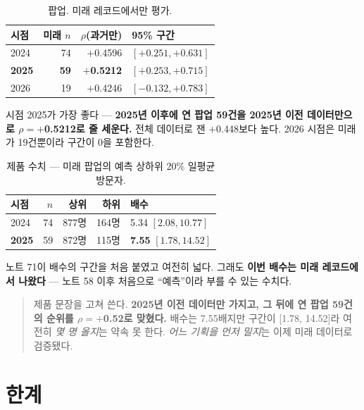 \documentclass[10pt]{article}
\begin{document}
\begin{table}[t]
\centering\tsize
\caption{팝업. 미래 레코드에서만 평가.}
\begin{tabular}{lrrl}
\toprule
시점 & 미래 $n$ & $\rho$(과거만) & 95\% 구간 \\
\midrule
2024 & 74 & $+$0.4596 & $[+0.251, +0.631]$ \\
\textbf{2025} & \textbf{59} & \textbf{$+$0.5212} & $[+0.253, +0.715]$ \\
2026 & 19 & $+$0.4246 & $[-0.132, +0.783]$ \\
\bottomrule
\end{tabular}
\end{table}

시점 2025가 가장 좋다 --- \textbf{2025년 이후에 연 팝업 59건을 2025년 이전
데이터만으로 $\rho=+$0.5212로 줄 세운다.} 전체 데이터로 잰 $+$0.448보다 높다.
2026 시점은 미래가 19건뿐이라 구간이 0을 포함한다.

\begin{table}[t]
\centering\tsize
\caption{제품 수치 --- 미래 팝업의 예측 상하위 20\% 일평균 방문자.}
\begin{tabular}{lrrrl}
\toprule
시점 & $n$ & 상위 & 하위 & 배수 \\
\midrule
2024 & 74 & 877명 & 164명 & 5.34 $[2.08, 10.77]$ \\
\textbf{2025} & 59 & 872명 & 115명 & \textbf{7.55} $[1.78, 14.52]$ \\
\bottomrule
\end{tabular}
\end{table}

노트 71이 배수의 구간을 처음 붙였고 여전히 넓다. 그래도 \textbf{이번 배수는
미래 레코드에서 나왔다} --- 노트 58 이후 처음으로 ``예측''이라 부를 수 있는
수치다.

\begin{quote}\fontsize{9.5}{11.5}\selectfont
제품 문장을 고쳐 쓴다. \textbf{2025년 이전 데이터만 가지고, 그 뒤에 연 팝업
59건의 순위를 $\rho=+$0.52로 맞혔다.} 배수는 7.55배지만 구간이 {[}1.78,
14.52{]}라 여전히 \emph{몇 명 올지}는 약속 못 한다. \emph{어느 기획을 먼저
밀지}는 이제 미래 데이터로 검증됐다.
\end{quote}

\section{한계}
\end{document}
